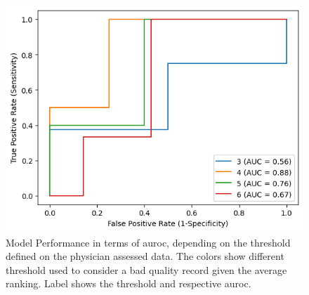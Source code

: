 \begin{figure}[htbp]
    \centering
    \caption{Model Performance in terms of \ac{auroc}, depending on the threshold defined on the physician assessed data. The colors show different threshold used to consider a bad quality record given the average ranking. Label shows the threshold and respective \ac{auroc}.}\label{fig:auc_changes} 
    \includegraphics[scale=0.78]{figures/auroc_curve_threshold.png}
    \end{figure}
